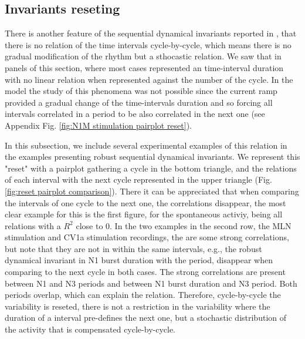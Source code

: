 \subsection{Invariants reseting}
There is another feature of the sequential dynamical invariants reported in \cite{elices_robust_2019}, that there is no relation of the time intervals cycle-by-cycle, which means there is no gradual modification of the rhythm but a sthocastic relation. We saw that in panels of this section, where most cases represented an time-interval duration with no linear relation when represented against the number of the cycle. In the model the study of this phenomena was not possible since the current ramp provided a gradual change of the time-intervals duration and so forcing all intervals correlated in a period to be also correlated in the next one (see Appendix Fig. \ref{fig:N1M stimulation pairplot reset}). 

In this subsection, we include several experimental examples of this relation in the examples presenting robust sequential dynamical invariants. We represent this "reset" with a pairplot gathering a cycle in the bottom triangle, and the relations of each interval with the next cycle represented in the upper triangle (Fig. \ref{fig:reset pairplot comparison}). There it can be appreciated that when comparing the intervals of one cycle to the next one, the correlations disappear, the most clear example for this is the first figure, for the spontaneous activiy, being all relations with a $R^2$ close to 0. In the two examples in the second row, the MLN stimulation and CV1a stimulation recordings, the are some strong correlations, but note that they are not in within the same intervals, e.g., the robust dynamical invariant in N1 burst duration with the period, disappear when comparing to the next cycle in both cases. The strong correlations are present between N1 and N3 periods and between N1 burst duration and N3 period. Both periods overlap, which can explain the relation. Therefore, cycle-by-cycle the variability is reseted, there is not a restriction in the variability where the duration of a interval pre-defines the next one, but a stochastic distribution of the activity that is compensated cycle-by-cycle. 

